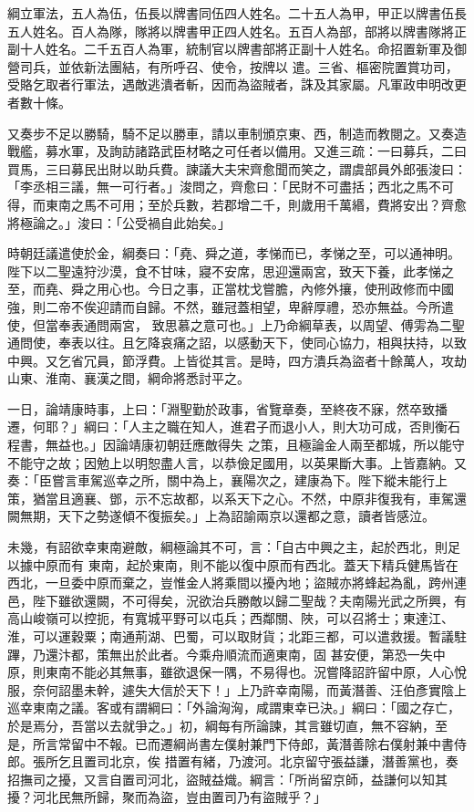 \begin{pinyinscope}
 綱立軍法，五人為伍，伍長以牌書同伍四人姓名。二十五人為甲，甲正以牌書伍長五人姓名。百人為隊，隊將以牌書甲正四人姓名。五百人為部，部將以牌書隊將正副十人姓名。二千五百人為軍，統制官以牌書部將正副十人姓名。命招置新軍及御營司兵，並依新法團結，有所呼召、使令，按牌以
 遣。三省、樞密院置賞功司，受賂乞取者行軍法，遇敵逃潰者斬，因而為盜賊者，誅及其家屬。凡軍政申明改更者數十條。



 又奏步不足以勝騎，騎不足以勝車，請以車制頒京東、西，制造而教閱之。又奏造戰艦，募水軍，及詢訪諸路武臣材略之可任者以備用。又進三疏：一曰募兵，二曰買馬，三曰募民出財以助兵費。諫議大夫宋齊愈聞而笑之，謂虞部員外郎張浚曰：「李丞相三議，無一可行者。」浚問之，齊愈曰：「民財不可盡括；西北之馬不可
 得，而東南之馬不可用；至於兵數，若郡增二千，則歲用千萬緡，費將安出？齊愈將極論之。」浚曰：「公受禍自此始矣。」



 時朝廷議遣使於金，綱奏曰：「堯、舜之道，孝悌而已，孝悌之至，可以通神明。陛下以二聖遠狩沙漠，食不甘味，寢不安席，思迎還兩宮，致天下養，此孝悌之至，而堯、舜之用心也。今日之事，正當枕戈嘗膽，內修外攘，使刑政修而中國強，則二帝不俟迎請而自歸。不然，雖冠蓋相望，卑辭厚禮，恐亦無益。今所遣使，但當奉表通問兩宮，
 致思慕之意可也。」上乃命綱草表，以周望、傅雱為二聖通問使，奉表以往。且乞降哀痛之詔，以感動天下，使同心協力，相與扶持，以致中興。又乞省冗員，節浮費。上皆從其言。是時，四方潰兵為盜者十餘萬人，攻劫山東、淮南、襄漢之間，綱命將悉討平之。



 一日，論靖康時事，上曰：「淵聖勤於政事，省覽章奏，至終夜不寐，然卒致播遷，何耶？」綱曰：「人主之職在知人，進君子而退小人，則大功可成，否則衡石程書，無益也。」因論靖康初朝廷應敵得失
 之策，且極論金人兩至都城，所以能守不能守之故；因勉上以明恕盡人言，以恭儉足國用，以英果斷大事。上皆嘉納。又奏：「臣嘗言車駕巡幸之所，關中為上，襄陽次之，建康為下。陛下縱未能行上策，猶當且適襄、鄧，示不忘故都，以系天下之心。不然，中原非復我有，車駕還闕無期，天下之勢遂傾不復振矣。」上為詔諭兩京以還都之意，讀者皆感泣。



 未幾，有詔欲幸東南避敵，綱極論其不可，言：「自古中興之主，起於西北，則足以據中原而有
 東南，起於東南，則不能以復中原而有西北。蓋天下精兵健馬皆在西北，一旦委中原而棄之，豈惟金人將乘間以擾內地；盜賊亦將蜂起為亂，跨州連邑，陛下雖欲還闕，不可得矣，況欲治兵勝敵以歸二聖哉？夫南陽光武之所興，有高山峻嶺可以控扼，有寬城平野可以屯兵；西鄰關、陜，可以召將士；東達江、淮，可以運穀粟；南通荊湖、巴蜀，可以取財貨；北距三都，可以遣救援。暫議駐蹕，乃還汴都，策無出於此者。今乘舟順流而適東南，固
 甚安便，第恐一失中原，則東南不能必其無事，雖欲退保一隅，不易得也。況嘗降詔許留中原，人心悅服，奈何詔墨未幹，遽失大信於天下！」上乃許幸南陽，而黃潛善、汪伯彥實陰上巡幸東南之議。客或有謂綱曰：「外論洶洶，咸謂東幸已決。」綱曰：「國之存亡，於是焉分，吾當以去就爭之。」初，綱每有所論諫，其言雖切直，無不容納，至是，所言常留中不報。已而遷綱尚書左僕射兼門下侍郎，黃潛善除右僕射兼中書侍郎。張所乞且置司北京，俟
 措置有緒，乃渡河。北京留守張益謙，潛善黨也，奏招撫司之擾，又言自置司河北，盜賊益熾。綱言：「所尚留京師，益謙何以知其擾？河北民無所歸，聚而為盜，豈由置司乃有盜賊乎？」




\end{pinyinscope}
